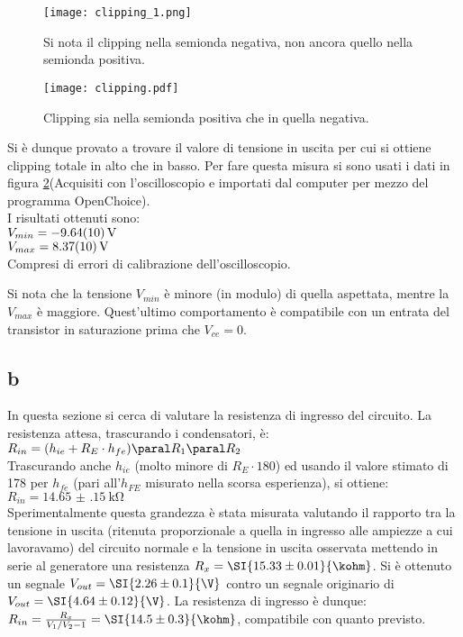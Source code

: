 \begin{figure}[h]
\centering
	\texttt{[image: clipping\_1.png]}
	\caption{Si nota il clipping nella semionda negativa, non ancora quello nella semionda positiva.\label{f:Cli}}
\end{figure}

\begin{figure}[h]
\centering
	\texttt{[image: clipping.pdf]}
	\caption{Clipping sia nella semionda positiva che in quella negativa.\label{f:Cli2}}
\end{figure}

Si è dunque provato a trovare il valore di tensione in uscita per cui si ottiene clipping totale in alto che in basso. Per fare questa misura si sono usati i dati in figura \ref{f:Cli2}(Acquisiti con l'oscilloscopio e importati dal computer per mezzo del programma OpenChoice).\\
I risultati ottenuti sono:\\
$V_{min}=\SI{-9.64\pm 0.1}{V}$\\
$V_{max}=\SI{ 8.37\pm 0.1}{V}$\\
Compresi di errori di calibrazione dell'oscilloscopio.

Si nota che la tensione $V_{min}$ è minore (in modulo) di quella aspettata, mentre la $V_{max}$ è maggiore. Quest'ultimo comportamento è compatibile con un entrata del transistor in saturazione prima che $V_{ce}=0$.

\subsection{b}
In questa sezione si cerca di valutare la resistenza di ingresso del circuito. La resistenza attesa, trascurando i condensatori, è:\\
$R_{in}=(h_{ie}+R_E \cdot h_{fe}) \paral R_1 \paral R_2$\\
Trascurando anche $h_{ie}$ (molto minore di $R_E\cdot180$) ed usando il valore stimato di 178 per $h_{fe}$ (pari all'$h_{FE}$ misurato nella scorsa esperienza), si ottiene:\\
$R_{in} =\SI{ 14.65(15)}{\kohm}$\\
Sperimentalmente questa grandezza è stata misurata valutando il rapporto tra la tensione in uscita (ritenuta proporzionale a quella in ingresso alle ampiezze a cui lavoravamo) del circuito normale e la tensione in uscita osservata mettendo in serie al generatore una resistenza $R_x=\SI{15.33\pm 0.01}{\kohm}$. Si è ottenuto un segnale $V_{out}=\SI{2.26 \pm 0.1}{\V}$ contro un segnale originario di  $V_{out}=\SI{4.64 \pm 0.12}{\V}$. La resistenza di ingresso è dunque:\\
$R_{in}=\frac{R_x}{V_1/V_2-1}=\SI{14.5\pm 0.3}{\kohm}$, compatibile con quanto previsto.

